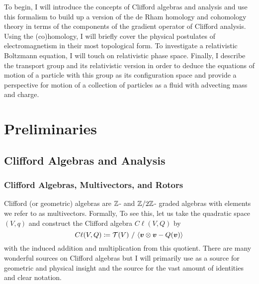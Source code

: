 \documentclass[conf]{new-aiaa}
\begin{document}
To begin, I will introduce the concepts of Clifford algebras and analysis and use this formalism to build up a version of the de Rham homology and cohomology theory in terms of the components of the gradient operator of Clifford analysis. Using the (co)homology, I will briefly cover the physical postulates of electromagnetism in their most topological form. To investigate a relativistic Boltzmann equation, I will touch on relativistic phase space. Finally, I describe the transport group and its relativistic version in order to deduce the equations of motion of a particle with this group as its configuration space and provide a perspective for motion of a collection of particles as a fluid with advecting mass and charge.  

\section{Preliminaries}

\subsection{Clifford Algebras and Analysis}

\subsubsection{Clifford Algebras, Multivectors, and Rotors}

Clifford (or geometric) algebras are $\mathbb{Z}$- and $\mathbb{Z}/2\mathbb{Z}$- graded algebras with elements we refer to as multivectors. Formally, To see this, let us take the quadratic space $(V,q)$ and construct the Clifford algebra $C\ell(V,Q)$ by
\begin{equation}
C\ell(V,Q) \coloneqq \mathcal{T}(V) ~ / ~ \langle \boldsymbol{v} \otimes \boldsymbol{v} - Q(\boldsymbol{v}) \rangle
\end{equation}
with the induced addition and multiplication from this quotient. There are many wonderful sources on Clifford algebras but I will primarily use \cite{doran_geometric_2003} as a source for geometric and physical insight and the source \cite{chisolm_geometric_2012} for the vast amount of identities and clear notation. 
\end{document}
